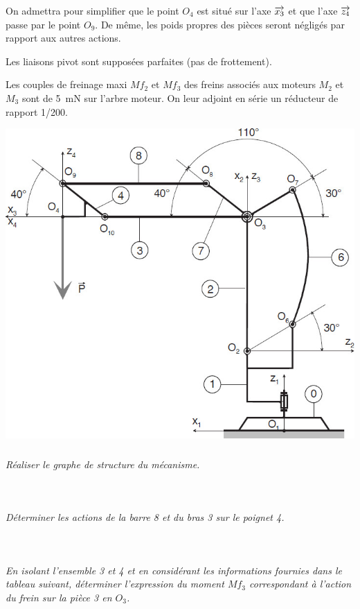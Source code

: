 \documentclass[10pt,fleqn]{article} %
\begin{document}
\begin{multicols}{2}
On admettra pour simplifier que le point $O_4$ est situé sur l’axe  $\overrightarrow{x_3}$ et que l’axe $\overrightarrow{z_4}$ passe par le 
point  $O_9$.  De  même,  les  poids  propres  des  pièces  seront  négligés  par  rapport  aux  autres 
actions. 

Les liaisons pivot sont supposées parfaites (pas de frottement). 

Les  couples de  freinage maxi $Mf_2$ et $Mf_3$ des  freins  associés  aux moteurs $M_2$ et $M_3$ sont de 
\SI{5}{mN} sur l’arbre moteur. On leur adjoint en série un réducteur de rapport 1/200. 

\begin{center}
\includegraphics[width=\linewidth]{images/fig_02}
\end{center}


\subparagraph{}\textit{Réaliser le graphe de structure du mécanisme.}
\ifprof
\begin{corrige}~\\

\end{corrige}
\else
\fi


\subparagraph{}\textit{Déterminer les actions de la barre 8 et du bras 3 sur le poignet 4.}
\ifprof
\begin{corrige}~\\

\end{corrige}
\else
\fi

\subparagraph{}\textit{En isolant l’ensemble 3 et 4 et en considérant les informations fournies dans le tableau suivant, déterminer l’expression du moment $Mf_3$ correspondant à l’action
du frein sur la pièce 3 en $O_3$. }
\ifprof
\begin{corrige}~\\


\end{corrige}
\end{multicols}
\end{document}
